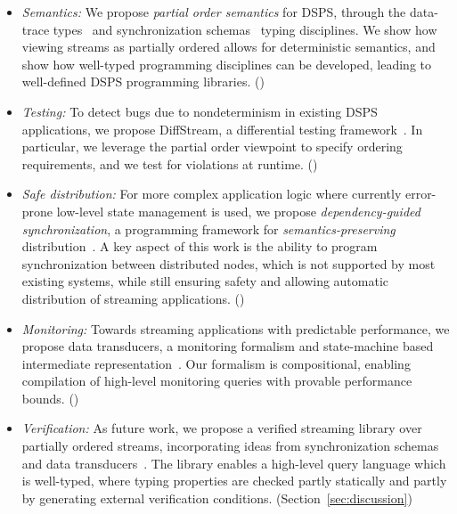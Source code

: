 \begin{itemize}
\item
\emph{Semantics:}
We propose \emph{partial order semantics} for DSPS,
through the data-trace types~ and synchronization schemas~ typing disciplines.
We show how viewing streams as partially ordered allows for deterministic semantics,
and show how well-typed programming disciplines can be developed,
leading to well-defined DSPS programming libraries.
()

\item
\emph{Testing:}
To detect bugs due to nondeterminism in existing DSPS applications,
we propose DiffStream, a differential testing framework~.
In particular, we leverage the partial order viewpoint to specify
ordering requirements, and we test for violations at runtime.
()

\item
\emph{Safe distribution:}
For more complex application logic where currently error-prone
low-level state management is used,
we propose \emph{dependency-guided synchronization},
a programming framework for \emph{semantics-preserving} distribution~.
A key aspect of this work is the ability to program
synchronization between distributed nodes, which is not supported
by most existing systems,
while still ensuring safety and allowing automatic distribution
of streaming applications.
()

\item
\emph{Monitoring:}
Towards streaming applications with predictable performance,
we propose data transducers, a monitoring formalism and state-machine based intermediate representation~.
Our formalism is compositional, enabling compilation of high-level
monitoring queries with provable performance bounds.
()

\item
\emph{Verification:}
As future work, we propose a verified streaming library
over partially ordered streams, incorporating ideas from synchronization schemas~ and data transducers~.
The library enables a high-level query language which is well-typed,
where typing properties are checked partly statically and partly by
generating external verification conditions.
(Section~\ref{sec:discussion})
\end{itemize}
